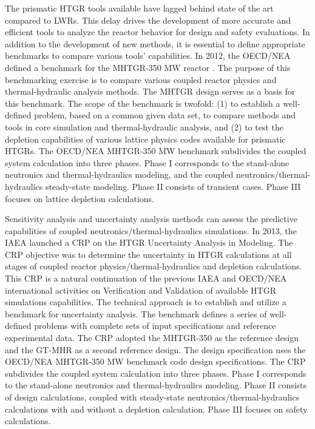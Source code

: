 The prismatic \gls{HTGR} tools available have lagged behind state of the art compared to \glspl{LWR}.
This delay drives the development of more accurate and efficient tools to analyze the reactor behavior for design and safety evaluations.
In addition to the development of new methods, it is essential to define appropriate benchmarks to compare various tools' capabilities.
In 2012, the \gls{OECD}/\gls{NEA} defined a benchmark for the \gls{MHTGR}-350 MW reactor \cite{oecd_nea_benchmark_2017}.
The purpose of this benchmarking exercise is to compare various coupled reactor physics and thermal-hydraulic analysis methods.
The MHTGR design serves as a basis for this benchmark.
The scope of the benchmark is twofold: (1) to establish a well-defined problem, based on a common given data set, to compare methods and tools in core simulation and thermal-hydraulic analysis, and (2) to test the depletion capabilities of various lattice physics codes available for prismatic \glspl{HTGR}.
The OECD/NEA MHTGR-350 MW benchmark subdivides the coupled system calculation into three phases.
Phase I corresponds to the stand-alone neutronics and thermal-hydraulics modeling, and the coupled neutronics/thermal-hydraulics steady-state modeling.
Phase II consists of transient cases.
Phase III focuses on lattice depletion calculations.

Sensitivity analysis and uncertainty analysis methods can assess the predictive capabilities of coupled neutronics/thermal-hydraulics simulations.
In 2013, the IAEA launched a \gls{CRP} \cite{tyobeka_htgr_2011} on the \gls{HTGR} Uncertainty Analysis in Modeling.
The \gls{CRP} objective was to determine the uncertainty in \gls{HTGR} calculations at all stages of coupled reactor physics/thermal-hydraulics and depletion calculations.
This \gls{CRP} is a natural continuation of the previous IAEA and OECD/NEA international activities \cite{iaea_evaluation_2003}\cite{reitsma_oecd-neansc_2008} on Verification and Validation of available \gls{HTGR} simulations capabilities.
The technical approach is to establish and utilize a benchmark for uncertainty analysis.
The benchmark defines a series of well-defined problems with complete sets of input specifications and reference experimental data.
The CRP adopted the MHTGR-350 as the reference design and the GT-MHR as a second reference design.
The design specification uses the OECD/NEA MHTGR-350 MW benchmark \cite{oecd_nea_benchmark_2017} code design specifications.
The CRP subdivides the coupled system calculation into three phases.
Phase I corresponds to the stand-alone neutronics and thermal-hydraulics modeling.
Phase II consists of design calculations, coupled with steady-state neutronics/thermal-hydraulics calculations with and without a depletion calculation.
Phase III focuses on safety calculations.